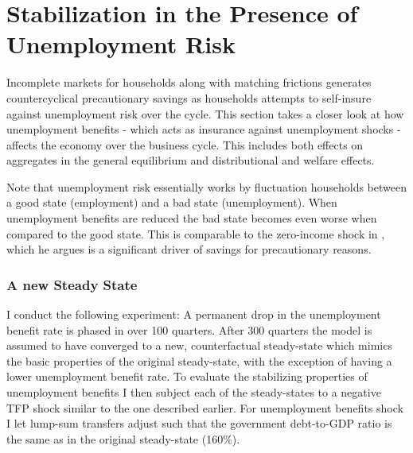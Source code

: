 

\pagebreak 
\section{Stabilization in the Presence of Unemployment Risk}
Incomplete markets for households along with matching frictions generates countercyclical precautionary savings as households attempts to self-insure against unemployment risk over the cycle. This section takes a closer look at how unemployment benefits - which acts as insurance against unemployment shocks - affects the economy over the business cycle. This includes both effects on aggregates in the general equilibrium and distributional and welfare effects.    

Note that unemployment risk essentially works by fluctuation households between a good state (employment) and a bad state (unemployment). When unemployment benefits are reduced the bad state becomes even worse when compared to the good state. This is comparable to the zero-income shock in \citet{carroll1997buffer}, which he argues is a significant driver of savings for precautionary  reasons. 





\subsubsection{A new Steady State}
I conduct the following experiment:
A permanent drop in the unemployment benefit rate is phased in over 100 quarters. After 300 quarters the model is assumed to have converged to a new, counterfactual steady-state which mimics the basic properties of the original steady-state, with the exception of having a lower unemployment benefit rate. To evaluate the stabilizing properties of unemployment benefits I then subject each of the steady-states to a negative TFP shock similar to the one described earlier. For unemployment benefits shock I let lump-sum transfers adjust such that the government debt-to-GDP ratio is the same as in the original steady-state (160\%).

